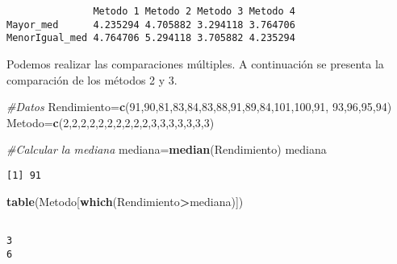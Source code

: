 \documentclass[
  a4paper,
  oneside,
  openany]{book}
\newenvironment{Shaded}{\begin{snugshade}}{\end{snugshade}}
\newcommand{\CommentTok}[1]{\textcolor[rgb]{0.56,0.35,0.01}{\textit{#1}}}
\newcommand{\DecValTok}[1]{\textcolor[rgb]{0.00,0.00,0.81}{#1}}
\newcommand{\FunctionTok}[1]{\textcolor[rgb]{0.13,0.29,0.53}{\textbf{#1}}}
\newcommand{\NormalTok}[1]{#1}
\newcommand{\OtherTok}[1]{\textcolor[rgb]{0.56,0.35,0.01}{#1}}
\newcommand{\SpecialCharTok}[1]{\textcolor[rgb]{0.81,0.36,0.00}{\textbf{#1}}}
\begin{document}
\begin{verbatim}
               Metodo 1 Metodo 2 Metodo 3 Metodo 4
Mayor_med      4.235294 4.705882 3.294118 3.764706
MenorIgual_med 4.764706 5.294118 3.705882 4.235294
\end{verbatim}

Podemos realizar las comparaciones múltiples. A continuación se presenta la comparación de los métodos 2 y 3.

\begin{Shaded}
\begin{Highlighting}[]
\CommentTok{\#Datos}
\NormalTok{Rendimiento}\OtherTok{=}\FunctionTok{c}\NormalTok{(}\DecValTok{91}\NormalTok{,}\DecValTok{90}\NormalTok{,}\DecValTok{81}\NormalTok{,}\DecValTok{83}\NormalTok{,}\DecValTok{84}\NormalTok{,}\DecValTok{83}\NormalTok{,}\DecValTok{88}\NormalTok{,}\DecValTok{91}\NormalTok{,}\DecValTok{89}\NormalTok{,}\DecValTok{84}\NormalTok{,}\DecValTok{101}\NormalTok{,}\DecValTok{100}\NormalTok{,}\DecValTok{91}\NormalTok{,}
              \DecValTok{93}\NormalTok{,}\DecValTok{96}\NormalTok{,}\DecValTok{95}\NormalTok{,}\DecValTok{94}\NormalTok{)}
\NormalTok{Metodo}\OtherTok{=}\FunctionTok{c}\NormalTok{(}\DecValTok{2}\NormalTok{,}\DecValTok{2}\NormalTok{,}\DecValTok{2}\NormalTok{,}\DecValTok{2}\NormalTok{,}\DecValTok{2}\NormalTok{,}\DecValTok{2}\NormalTok{,}\DecValTok{2}\NormalTok{,}\DecValTok{2}\NormalTok{,}\DecValTok{2}\NormalTok{,}\DecValTok{2}\NormalTok{,}\DecValTok{3}\NormalTok{,}\DecValTok{3}\NormalTok{,}\DecValTok{3}\NormalTok{,}\DecValTok{3}\NormalTok{,}\DecValTok{3}\NormalTok{,}\DecValTok{3}\NormalTok{,}\DecValTok{3}\NormalTok{)}

\CommentTok{\#Calcular la mediana}
\NormalTok{mediana}\OtherTok{=}\FunctionTok{median}\NormalTok{(Rendimiento)}
\NormalTok{mediana}
\end{Highlighting}
\end{Shaded}

\begin{verbatim}
[1] 91
\end{verbatim}

\begin{Shaded}
\begin{Highlighting}[]
\FunctionTok{table}\NormalTok{(Metodo[}\FunctionTok{which}\NormalTok{(Rendimiento}\SpecialCharTok{\textgreater{}}\NormalTok{mediana)])}
\end{Highlighting}
\end{Shaded}

\begin{verbatim}

3 
6 
\end{verbatim}
\end{document}
